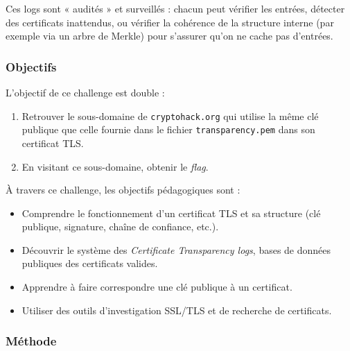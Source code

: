 \documentclass[12pt, a4paper]{article}
\begin{document}
            Ces logs sont « audités » et surveillés : chacun peut vérifier les entrées, détecter des certificats inattendus, ou vérifier la cohérence de la structure interne (par exemple via un arbre de Merkle) pour s'assurer qu'on ne cache pas d'entrées.
            
        \subsubsection{Objectifs}
            L'objectif de ce challenge est double :
            \begin{enumerate}
                \item Retrouver le sous-domaine de \texttt{cryptohack.org} qui utilise la même clé publique que celle fournie dans le fichier \texttt{transparency.pem} dans son certificat TLS.
                \item En visitant ce sous-domaine, obtenir le \emph{flag}.
            \end{enumerate}
            
            À travers ce challenge, les objectifs pédagogiques sont :
            \begin{itemize}
                \item Comprendre le fonctionnement d’un certificat TLS et sa structure (clé publique, signature, chaîne de confiance, etc.).
                \item Découvrir le système des \emph{Certificate Transparency logs}, bases de données publiques des certificats valides.
                \item Apprendre à faire correspondre une clé publique à un certificat.
                \item Utiliser des outils d’investigation SSL/TLS et de recherche de certificats.
            \end{itemize}
        
        \subsubsection{Méthode}
\end{document}
